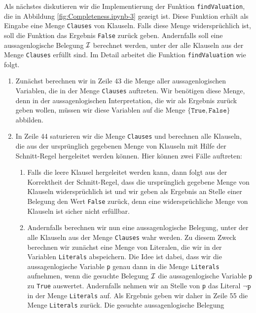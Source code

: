 \FloatBarrier

Als nächstes diskutieren wir die Implementierung der Funktion \texttt{findValuation}, die in
Abbildung \ref{fig:Completeness.ipynb-3} gezeigt ist.  Diese Funktion erhält als Eingabe eine Menge
\texttt{Clauses} von Klauseln.  Falls diese Menge widersprüchlich ist, soll die Funktion
das Ergebnis \texttt{False} zurück geben.  Andernfalls soll eine aussagenlogische Belegung $\mathcal{I}$ berechnet werden,
unter der alle Klauseln aus der Menge \texttt{Clauses} erfüllt sind.
Im Detail arbeitet die Funktion \texttt{findValuation} wie folgt.
\begin{enumerate}
\item Zunächst berechnen wir in Zeile 43 die Menge aller aussagenlogischen Variablen, die in der Menge
      \texttt{Clauses} auftreten.  Wir benötigen diese Menge, denn in der
      aussagenlogischen Interpretation, die wir als Ergebnis zurück geben wollen, müssen 
      wir diese Variablen auf die Menge $\{ \texttt{True}, \texttt{False} \}$ abbilden.       
\item In Zeile 44 saturieren wir die Menge \texttt{Clauses} und berechnen alle Klauseln, die aus der
      ursprünglich gegebenen Menge von Klauseln mit Hilfe der Schnitt-Regel hergeleitet werden
      können.  Hier können zwei Fälle auftreten:
      \begin{enumerate}
      \item Falls die leere Klausel hergeleitet werden kann, dann folgt aus der Korrektheit der Schnitt-Regel,
            dass die ursprünglich gegebene Menge von Klauseln widersprüchlich ist und wir geben als Ergebnis an
            Stelle einer Belegung den Wert \texttt{False} zurück, denn eine widersprüchliche Menge von Klauseln
            ist sicher nicht erfüllbar.
      \item Andernfalls berechnen wir nun eine aussagenlogische Belegung, unter der alle Klauseln aus
            der Menge \texttt{Clauses} wahr werden.  Zu diesem Zweck berechnen wir zunächst eine Menge von
            Literalen, die wir in der Variablen \texttt{Literals} abspeichern.  Die Idee ist dabei, dass wir
            die aussagenlogische Variable \texttt{p} genau dann in die Menge \texttt{Literals} aufnehmen, wenn
            die gesuchte Belegung $\mathcal{I}$ die aussagenlogische
            Variable \texttt{p} zu \texttt{True} auswertet.  Andernfalls nehmen wir an Stelle von \texttt{p} das
            Literal $\neg \texttt{p}$ in der Menge \texttt{Literals} auf.  Als Ergebnis geben wir daher in
            Zeile 55 die Menge \texttt{Literals} zurück.  Die gesuchte aussagenlogische Belegung

\end{enumerate}
\end{enumerate}
